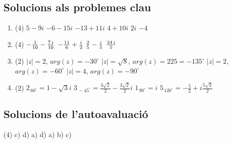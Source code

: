 \subsection*{Solucions als problemes clau \simbolclau}
\begin{enumerate}
	 \item[\clauref{t4_key2}]  
	 \begin{tasks}(4)
	    \task $5 -9i$
	    \task $-6-15i$
	    \task $-13+11i$
	 	\task $4 + 10i$
	 	\task $2i$
	 	\task $-4$
	 \end{tasks}
 
  \item[\clauref{t4_key3}]  
 \begin{tasks}(4)
 	\task $-{{1}\over{10}}-{{7\,i}\over{10}}$
 	\task $-{{11}\over{6}}+{{i}\over{2}}$
 	\task ${{2}\over{5}}-{{i}\over{5}}$
 	\task ${{34\,i}\over{5}}$
 \end{tasks}
 
 \item[\clauref{t4_key5}]  
 \begin{tasks}(2)
 	\task $|z|=2$,  $arg(z)=-30^\circ$
 	\task $|z|=\sqrt{8}$,  $arg(z)=225 = - 135^\circ$
 	\task $|z|=2$,  $arg(z)=-60^\circ$
 	\task $|z|=4$,  $arg(z)=-90^\circ$
 \end{tasks}

\item[\clauref{t4_key10}]  
 \begin{tasks}(2)
 	\task $2_{\, 60^\circ}= 1 - \sqrt{3} i$
 	\task $3_{\, -45^\circ}= \frac{3\sqrt{2}}{2} - \frac{3\sqrt{2}}{2} i$
 	\task $1_{\, 90^\circ}= i $
 	\task $5_{\, 120^\circ}= -\frac{5}{2} + i \frac{5\sqrt{3}}{2}$
 \end{tasks}
\end{enumerate}

\subsection*{Solucions de l'autoavaluació}
\begin{tasks}[style=enumerate,label-width=4ex](4)
	\task c)
	\task d)
	\task a)
	\task d)
	\task a)
	\task b)
	\task c)
\end{tasks}




